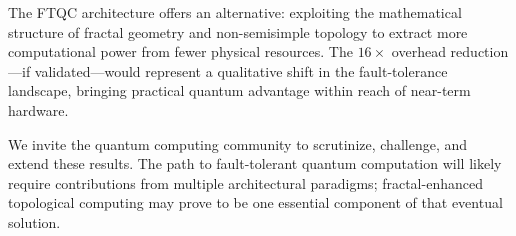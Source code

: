 The FTQC architecture offers an alternative: exploiting the mathematical structure of fractal geometry and non-semisimple topology to extract more computational power from fewer physical resources. The $16\times$ overhead reduction—if validated—would represent a qualitative shift in the fault-tolerance landscape, bringing practical quantum advantage within reach of near-term hardware.

We invite the quantum computing community to scrutinize, challenge, and extend these results. The path to fault-tolerant quantum computation will likely require contributions from multiple architectural paradigms; fractal-enhanced topological computing may prove to be one essential component of that eventual solution.
